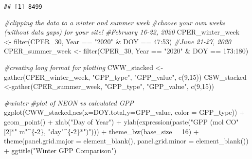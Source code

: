 \documentclass[
]{article}
\newenvironment{Shaded}{\begin{snugshade}}{\end{snugshade}}
\newcommand{\AttributeTok}[1]{\textcolor[rgb]{0.77,0.63,0.00}{#1}}
\newcommand{\CommentTok}[1]{\textcolor[rgb]{0.56,0.35,0.01}{\textit{#1}}}
\newcommand{\DecValTok}[1]{\textcolor[rgb]{0.00,0.00,0.81}{#1}}
\newcommand{\FunctionTok}[1]{\textcolor[rgb]{0.00,0.00,0.00}{#1}}
\newcommand{\NormalTok}[1]{#1}
\newcommand{\OtherTok}[1]{\textcolor[rgb]{0.56,0.35,0.01}{#1}}
\newcommand{\SpecialCharTok}[1]{\textcolor[rgb]{0.00,0.00,0.00}{#1}}
\newcommand{\StringTok}[1]{\textcolor[rgb]{0.31,0.60,0.02}{#1}}
\begin{document}
\begin{verbatim}
## [1] 8499
\end{verbatim}

\begin{Shaded}
\begin{Highlighting}[]
\CommentTok{\#clipping the data to a winter and summer week}
 \CommentTok{\#choose your own weeks (without data gaps) for your site!}
\CommentTok{\#February 16{-}22, 2020}
\NormalTok{CPER\_winter\_week }\OtherTok{\textless{}{-}} \FunctionTok{filter}\NormalTok{(CPER\_30, Year }\SpecialCharTok{==} \StringTok{"2020"} \SpecialCharTok{\&}\NormalTok{ DOY }\SpecialCharTok{==} \DecValTok{47}\SpecialCharTok{:}\DecValTok{53}\NormalTok{)}
\CommentTok{\#June 21{-}27, 2020}
\NormalTok{CPER\_summer\_week }\OtherTok{\textless{}{-}} \FunctionTok{filter}\NormalTok{(CPER\_30, Year }\SpecialCharTok{==} \StringTok{"2020"} \SpecialCharTok{\&}\NormalTok{ DOY }\SpecialCharTok{==} \DecValTok{173}\SpecialCharTok{:}\DecValTok{180}\NormalTok{)}

\CommentTok{\#creating long format for plotting}
\NormalTok{CWW\_stacked }\OtherTok{\textless{}{-}}\FunctionTok{gather}\NormalTok{(CPER\_winter\_week, }\StringTok{"GPP\_type"}\NormalTok{, }\StringTok{"GPP\_value"}\NormalTok{, }\FunctionTok{c}\NormalTok{(}\DecValTok{9}\NormalTok{,}\DecValTok{15}\NormalTok{))}
\NormalTok{CSW\_stacked }\OtherTok{\textless{}{-}}\FunctionTok{gather}\NormalTok{(CPER\_summer\_week, }\StringTok{"GPP\_type"}\NormalTok{, }\StringTok{"GPP\_value"}\NormalTok{, }\FunctionTok{c}\NormalTok{(}\DecValTok{9}\NormalTok{,}\DecValTok{15}\NormalTok{))}

\CommentTok{\#winter}
\CommentTok{\#plot of NEON vs calculated GPP}
\FunctionTok{ggplot}\NormalTok{(CWW\_stacked,}\FunctionTok{aes}\NormalTok{(}\AttributeTok{x=}\NormalTok{DOY.total,}\AttributeTok{y=}\NormalTok{GPP\_value, }\AttributeTok{color =}\NormalTok{ GPP\_type)) }\SpecialCharTok{+} \FunctionTok{geom\_point}\NormalTok{() }\SpecialCharTok{+} 
    \FunctionTok{xlab}\NormalTok{(}\StringTok{"Day of Year"}\NormalTok{) }\SpecialCharTok{+} 
    \FunctionTok{ylab}\NormalTok{(}\FunctionTok{expression}\NormalTok{(}\FunctionTok{paste}\NormalTok{(}\StringTok{"GPP (mol CO"}\NormalTok{[}\DecValTok{2}\NormalTok{]}\SpecialCharTok{*}\StringTok{" m"}\SpecialCharTok{\^{}}\NormalTok{\{}\SpecialCharTok{{-}}\DecValTok{2}\NormalTok{\}, }\StringTok{"day"}\SpecialCharTok{\^{}}\NormalTok{\{}\SpecialCharTok{{-}}\DecValTok{2}\NormalTok{\}}\SpecialCharTok{*}\StringTok{")"}\NormalTok{))) }\SpecialCharTok{+}
    \FunctionTok{theme\_bw}\NormalTok{(}\AttributeTok{base\_size =} \DecValTok{16}\NormalTok{) }\SpecialCharTok{+} \FunctionTok{theme}\NormalTok{(}\AttributeTok{panel.grid.major =} \FunctionTok{element\_blank}\NormalTok{(), }\AttributeTok{panel.grid.minor =} \FunctionTok{element\_blank}\NormalTok{()) }\SpecialCharTok{+} \FunctionTok{ggtitle}\NormalTok{(}\StringTok{"Winter GPP Comparison"}\NormalTok{)}
\end{Highlighting}
\end{Shaded}
\end{document}
